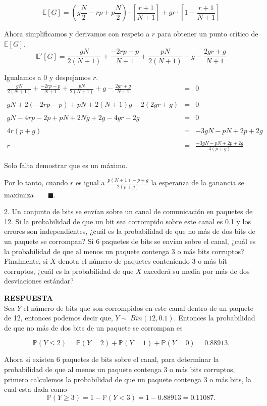 \documentclass[11pt,letterpaper]{article}
\newcommand{\mP}{\mathbb{P}}
\newcommand{\mE}{\mathbb{E}}
\newcommand{\res}{\textbf{RESPUESTA}\\}
\newcommand{\fin}{$\blacksquare.$}
\begin{document}
\begin{itemize}
$$\mE[G]= \left( g\frac{N}{2}-rp+p\frac{N}{2}\right)\cdot\left[ \frac{r+1}{N+1}\right] +gr \cdot\left[1- \frac{r+1}{N+1} \right]$$

Ahora simplificamos y derivamos con respeto a $r$ para obtener un punto crítico de $\mE [G]$. 
$$\mE'[G]= \frac{gN}{2(N+1)}+\frac{-2rp-p}{N+1}+\frac{pN}{2(N+1)}+g-\frac{2gr+g}{N+1}$$

Igualamos a 0 y despejamos $r$.
\begin{equation*}
\begin{array}{ccl}
\frac{gN}{2(N+1)}+\frac{-2rp-p}{N+1}+\frac{pN}{2(N+1)}+g-\frac{2gr+g}{N+1}&=&0\\
&&\\
gN+2(-2rp-p)+pN+2(N+1)g-2(2gr+g)&=&0\\
&&\\
gN-4rp-2p+pN+2Ng+2g-4gr-2g&=&0\\
&&\\
4r(p+g)&=&-3gN -pN+2p+2g\\
&&\\
r&=&\frac{-3gN -pN+2p+2g}{4(p+g)}
\end{array}
\end{equation*}

Solo falta demostrar que es un máximo. 

Por lo tanto, cuando $r$ es igual a $\frac{p(N+1)-p+g}{2(p+g)}$ la esperanza de la ganancia se maximiza\ \ \ \ \fin 

2. Un conjunto de bits se envían sobre un canal de comunicación en paquetes de 12. Si la probabilidad de que un bit sea corrompido sobre este canal es 0.1 y los errores son independientes,
¿cuál es la probabilidad de que no más de dos bits de un paquete se corrompan? Si 6 paquetes
de bits se envían sobre el canal, ¿cuál es la probabilidad de que al menos un paquete contenga 3 o más bits corruptos? Finalmente, si $X$ denota el número de paquetes conteniendo 3 o más bit corruptos, ¿cuál es la probabilidad de que $X$ excederá su media por más de dos desviaciones estándar? 

\res

Sea $Y$ el número de bits que son corrompidos en este canal dentro de un paquete de 12, entonces podemos decir que, $Y\sim \ Bin(12,0.1)$. Entonces la probabilidad de que no más de dos bits de un paquete se corrompan es

$$\mP(Y\leq2)= \mP(Y=2)+\mP(Y=1)+\mP(Y=0)=0.88913.$$

Ahora si existen 6 paquetes de bits sobre el canal, para determinar la probabilidad de que al menos un paquete contenga 3 o más bits corruptos, primero calculemos la probabilidad de que un paquete contenga 3 o más bits, la cual esta dada como 
$$\mP(Y\geq3) = 1-\mP(Y<3)=1-0.88913= 0.11087.$$



\end{itemize}
\end{document}

